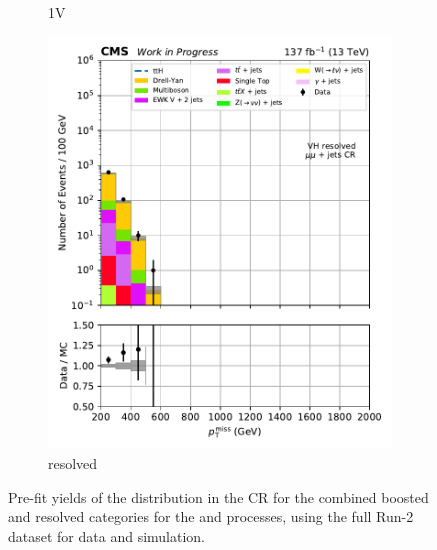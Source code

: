 \begin{figure}[htbp]
\begin{subfigure}[b]{0.24\textwidth}
        \caption{\VH 1V}
    \end{subfigure}
    \hfill
    \begin{subfigure}[b]{0.24\textwidth}
        \includegraphics[width=\textwidth]{figures/region_plots/2016to18/region_2/VH_resolved.pdf}
        \caption{\VH resolved}
    \end{subfigure}
    \caption[Pre-fit yields of the \ptmiss distribution in the \doubleMuCr control region for the combined boosted and resolved categories for the \ttH and \VH processes, using the full Run-2 dataset for data and simulation]{Pre-fit yields of the \ptmiss distribution in the \doubleMuCr \gls{CR} for the combined boosted and resolved categories for the \ttH and \VH processes, using the full Run-2 dataset for data and simulation.}
    \label{fig:htoinv_cr_yields_comb2016to18_double_muon}
\end{figure}

